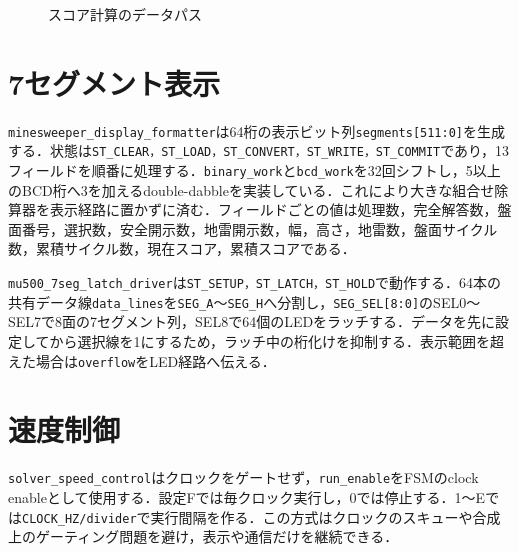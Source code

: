 \begin{figure}[tb]
\centering
{}
\caption{スコア計算のデータパス}
\end{figure}

\section{7セグメント表示}
\texttt{minesweeper\_display\_formatter}は64桁の表示ビット列\texttt{segments[511:0]}を生成する．状態は\texttt{ST\_CLEAR，ST\_LOAD，ST\_CONVERT，ST\_WRITE，ST\_COMMIT}であり，13フィールドを順番に処理する．\texttt{binary\_work}と\texttt{bcd\_work}を32回シフトし，5以上のBCD桁へ3を加えるdouble-dabbleを実装している．これにより大きな組合せ除算器を表示経路に置かずに済む．フィールドごとの値は処理数，完全解答数，盤面番号，選択数，安全開示数，地雷開示数，幅，高さ，地雷数，盤面サイクル数，累積サイクル数，現在スコア，累積スコアである．

\texttt{mu500\_7seg\_latch\_driver}は\texttt{ST\_SETUP，ST\_LATCH，ST\_HOLD}で動作する．64本の共有データ線\texttt{data\_lines}を\texttt{SEG\_A}～\texttt{SEG\_H}へ分割し，\texttt{SEG\_SEL[8:0]}のSEL0～SEL7で8面の7セグメント列，SEL8で64個のLEDをラッチする．データを先に設定してから選択線を1にするため，ラッチ中の桁化けを抑制する．表示範囲を超えた場合は\texttt{overflow}をLED経路へ伝える．

\section{速度制御}
\texttt{solver\_speed\_control}はクロックをゲートせず，\texttt{run\_enable}をFSMのclock enableとして使用する．設定Fでは毎クロック実行し，0では停止する．1～Eでは\texttt{CLOCK\_HZ/divider}で実行間隔を作る．この方式はクロックのスキューや合成上のゲーティング問題を避け，表示や通信だけを継続できる．

